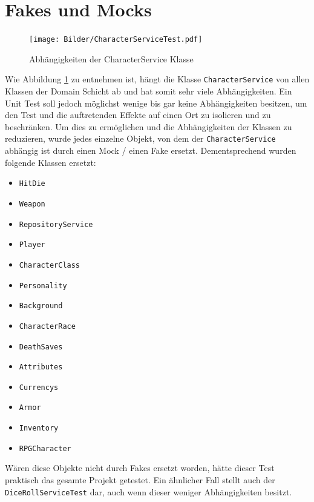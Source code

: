 \section{Fakes und Mocks}
\begin{figure}[H]
	\centering
	\texttt{[image: Bilder/CharacterServiceTest.pdf]}
	\caption{Abhängigkeiten der CharacterService Klasse}
	\label{fig:Mocks}
\end{figure}
Wie Abbildung \ref{fig:Mocks} zu entnehmen ist, hängt die Klasse \texttt{CharacterService} von allen Klassen der Domain Schicht ab und hat somit sehr viele Abhängigkeiten. Ein Unit Test soll jedoch möglichst wenige bis gar keine Abhängigkeiten besitzen, um den Test und die auftretenden Effekte auf einen Ort zu isolieren und zu beschränken. Um dies zu ermöglichen und die Abhängigkeiten der Klassen zu reduzieren, wurde jedes einzelne Objekt, von dem der \texttt{CharacterService} abhängig ist durch einen Mock / einen Fake ersetzt. Dementsprechend wurden folgende Klassen ersetzt:
\begin{itemize}
	\item \texttt{HitDie}
	\item \texttt{Weapon}
	\item \texttt{RepositoryService}
	\item \texttt{Player}
	\item \texttt{CharacterClass}
	\item \texttt{Personality}
	\item \texttt{Background}
	\item \texttt{CharacterRace}
	\item \texttt{DeathSaves}
	\item \texttt{Attributes}
	\item \texttt{Currencys}
	\item \texttt{Armor}
	\item \texttt{Inventory}
	\item \texttt{RPGCharacter}
\end{itemize}
Wären diese Objekte nicht durch Fakes ersetzt worden, hätte dieser Test praktisch das gesamte Projekt getestet. Ein ähnlicher Fall stellt auch der \texttt{DiceRollServiceTest} dar, auch wenn dieser weniger Abhängigkeiten besitzt.